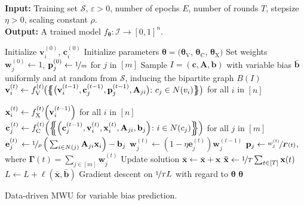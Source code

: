 \documentclass[11pt, DIV=12]{scrartcl}
\theoremstyle{definition}
\newcommand{\cI}{\ensuremath{{\mathcal I}}\xspace}
\newcommand{\cS}{\ensuremath{{\mathcal S}}\xspace}
\renewcommand{\vec}[1]{\mathbf{#1}}
\begin{document}
\begin{algorithm}[H]\mbox{\hfill}
	\\\textbf{Input:}  Training set $\cS$, $\varepsilon > 0$, number of epochs $E$, number of rounds $T$, stepsize $\eta > 0$, scaling constant $\rho$.  \\
	\textbf{Output:} A trained model $f_{\boldsymbol{\theta}} \colon \cI \to [0,1]^n$.
	\begin{algorithmic}[1]
		\State Initialize $\vec{v}_i^{(0)}$, $\vec{c}_i^{(0)}$
		\State Initialize parameters $\boldsymbol{\theta} = (\boldsymbol{\theta}_{\text{V}}$, $\boldsymbol{\theta}_{\text{C}}$, $\boldsymbol{\theta}_{\text{X}})$
		\State Set weights $\vec{w}_j^{(0)} \leftarrow 1$, $\vec{p}_j^{(0)} \leftarrow \nicefrac{1}{m}$ for $j$ in $[m]$
		\State Sample $I = (\vec{c}, \vec{A}, \vec{b})$ with variable bias $\vec{\bar{b}}$ uniformly and at random from $\cS$, inducing the bipartite graph $B(I)$
		\State $\vec{v}_i^{(t)} \leftarrow {f}^{(t)}_{\text{V}} \hspace{-1pt} \big( \big\{ \hspace{-4.4pt} \big\{ \big( \vec{v}^{(t-1)}_i, \vec{c}^{(t-1)}_j, \vec{p}^{(t-1)}_j, \vec{A}_{ji} \big)\hspace{-1pt} \colon c_j \in N(v_i) \big\} \hspace{-4.4pt} \big\} \big)$ for all $i$ in $[n]$ 		
		
		\State $\vec{x}_i^{(t)} \leftarrow {f}^{(t)}_{\text{X}} \hspace{-2pt} \left(\vec{v}_i^{(t-1)} \right)$ for all $i$ in $[n]$ 
		\Statex
		\Statex
		\State $\vec{c}_j^{\hspace{1pt}(t)} \leftarrow {f}^{(t)}_{\text{C}} \hspace{-2pt} \left( \left\{ \hspace{-4.4pt} \left\{ \left( \vec{c}^{(t-1)}_j, \vec{v}^{(t)}_i, \vec{x}^{(t)}_i, \vec{A}_{ji}, \vec{b}_j \right)\hspace{-2pt} \colon i \in N(c_j) \right\} \hspace{-4.4pt} \right\} \right)$ for all $j$ in $[m]$ 	
		\State $\vec{e}_j^{(t)} \, \leftarrow \nicefrac{1}{\rho}\,\Big(\sum_{i \in N(j)} \label{key}\vec{A}_{ji}  \vec{x}_i \Big) - \vec{b}_j$
		\State $\vec{w}_j^{(t)} \leftarrow ( 1 -  \eta \vec{e}^{(t)}_j) \vec{w}_j^{(t-1)} $ 
		\State $\vec{p}_j \leftarrow \nicefrac{w_j^{(t)}}{\boldsymbol{\Gamma}(t)} $, where $\boldsymbol{\Gamma}(t) = \sum_{j \in [m]} \vec{w}^{(t)}_j$
		\State Update solution $\vec{\bar{x}} \leftarrow \vec{\bar{x}} + \vec{x}$
		\EndFor
		\State $\vec{\bar{x}} \leftarrow \nicefrac{1}{T} \sum_{t \in [T]} \vec{x}(t) $
		\State $L \leftarrow L + \ell(\vec{\bar{x}}, \vec{\bar b})$ 
		\State Gradient descent on $\nicefrac{1}{T} L$ with regard to $\boldsymbol{\theta}$
		\EndFor
		\State \Return $\boldsymbol{\theta}$
		
	\end{algorithmic}
	\caption{Data-driven MWU for variable bias prediction.}
	\label{alg:as2}
\end{algorithm}
\end{document}
